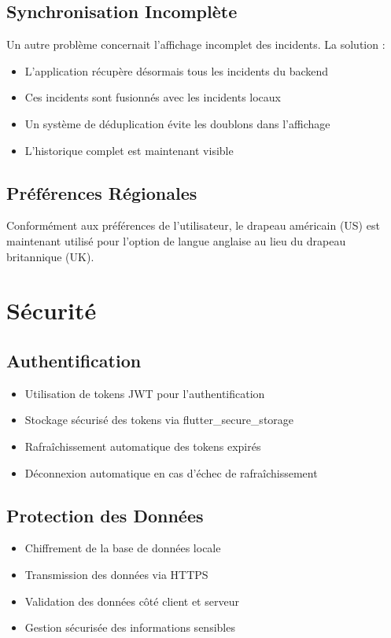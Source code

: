 \documentclass[12pt,a4paper]{article}
\begin{document}
\subsection{Synchronisation Incomplète}
Un autre problème concernait l'affichage incomplet des incidents. La solution :
\begin{itemize}
    \item L'application récupère désormais tous les incidents du backend
    \item Ces incidents sont fusionnés avec les incidents locaux
    \item Un système de déduplication évite les doublons dans l'affichage
    \item L'historique complet est maintenant visible
\end{itemize}

\subsection{Préférences Régionales}
Conformément aux préférences de l'utilisateur, le drapeau américain (US) est maintenant utilisé pour l'option de langue anglaise au lieu du drapeau britannique (UK).

\section{Sécurité}

\subsection{Authentification}
\begin{itemize}
    \item Utilisation de tokens JWT pour l'authentification
    \item Stockage sécurisé des tokens via flutter\_secure\_storage
    \item Rafraîchissement automatique des tokens expirés
    \item Déconnexion automatique en cas d'échec de rafraîchissement
\end{itemize}

\subsection{Protection des Données}
\begin{itemize}
    \item Chiffrement de la base de données locale
    \item Transmission des données via HTTPS
    \item Validation des données côté client et serveur
    \item Gestion sécurisée des informations sensibles
\end{itemize}
\end{document}
